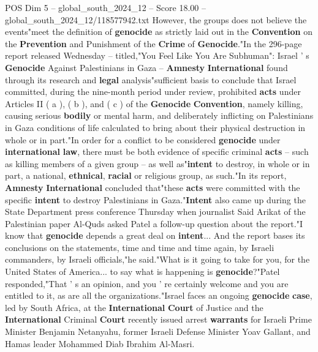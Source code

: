 \begin{textsample}{POS Dim 5 – global\_south\_2024\_12 – Score 18.00 – global\_south\_2024\_12/118577942.txt}
However, the groups does not believe the events"meet the definition of \textbf{genocide} as strictly laid out in the \textbf{Convention} on the \textbf{Prevention} and Punishment of the \textbf{Crime} of \textbf{Genocide}."In the 296-page report released Wednesday -- titled,"You Feel Like You Are Subhuman": Israel ' s \textbf{Genocide} Against Palestinians in Gaza -- \textbf{Amnesty} \textbf{International} found through its research and \textbf{legal} analysis"sufficient basis to conclude that Israel committed, during the nine-month period under review, prohibited \textbf{acts} under Articles II ( a ), ( b ), and ( c ) of the \textbf{Genocide} \textbf{Convention}, namely killing, causing serious \textbf{bodily} or mental harm, and deliberately inflicting on Palestinians in Gaza conditions of life calculated to bring about their physical destruction in whole or in part."In order for a conflict to be considered \textbf{genocide} under \textbf{international} \textbf{law}, there must be both evidence of specific criminal \textbf{acts} -- such as killing members of a given group -- as well as"\textbf{intent} to destroy, in whole or in part, a national, \textbf{ethnical}, \textbf{racial} or religious group, as such."In its report, \textbf{Amnesty} \textbf{International} concluded that"these \textbf{acts} were committed with the specific \textbf{intent} to destroy Palestinians in Gaza."\textbf{Intent} also came up during the State Department press conference Thursday when journalist Said Arikat of the Palestinian paper Al-Quds asked Patel a follow-up question about the report."I know that \textbf{genocide} depends a great deal on \textbf{intent}...
And the report bases its conclusions on the statements, time and time and time again, by Israeli commanders, by Israeli officials,"he said."What is it going to take for you, for the United States of America... to say what is happening is \textbf{genocide}?"Patel responded,"That ' s an opinion, and you ' re certainly welcome and you are entitled to it, as are all the organizations."Israel faces an ongoing \textbf{genocide} \textbf{case}, led by South Africa, at the \textbf{International} \textbf{Court} of Justice and the \textbf{International} Criminal \textbf{Court} recently issued arrest \textbf{warrants} for Israeli Prime Minister Benjamin Netanyahu, former Israeli Defense Minister Yoav Gallant, and Hamas leader Mohammed Diab Ibrahim Al-Masri.

\end{textsample}
